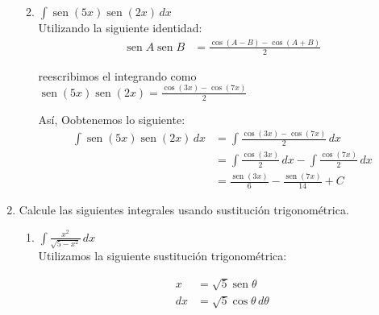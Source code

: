 \documentclass[a4paper,10pt]{article}
\newcommand{\dis}{\displaystyle}
\def\sin{\operatorname{sen}}
\begin{document}
\begin{enumerate}
\begin{enumerate}[label=\emph{\alph*)}]
\newpage
\item $\dis \int \sin(5x) \sin(2x)\, dx$\\

Utilizando la siguiente identidad:
\begin{align*}
 \dis \sin A \sin B  &=    \frac{\cos (A-B) - \cos (A+B)}{2}
\end{align*}

reescribimos el integrando como $\dis \sin(5x)\sin(2x) = \frac{\cos(3x)-\cos(7x)}{2}$

\dotfill [1 punto]

Así, Oobtenemos lo siguiente:
\begin{align*}
 \dis \int \sin(5x) \sin(2x)\, dx  &=    \dis \int \frac{\cos(3x)-\cos(7x)}{2} \, dx\\
 								   &=    \dis \int \frac{\cos (3x)}{2} \, dx - \int \frac{\cos (7x)}{2} \, dx\\
                                   &=    \dis \frac{\sin (3x)}{6} - \frac{\sin (7x)}{14} + C
\end{align*}
\dotfill [1 punto]




\end{enumerate}


\newpage
\item Calcule las siguientes integrales usando sustituci\'{o}n
trigonom\'{e}trica.
\begin{enumerate}[label=\emph{\alph*)}]
\item $\dis \int \frac{x^2}{\sqrt{5-x^2}}\, dx$\\

Utilizamos la siguiente sustitución trigonométrica:\\

\begin{minipage}{.3\textwidth}
\raggedright
\begin{align*}
x  &= \sqrt{5}\sin \theta      \\
dx &= \sqrt{5}\cos \theta  \, d\theta
\end{align*}
\end{minipage}%
\begin{minipage}{.3\textwidth}
\raggedleft
{}
\end{minipage}
\end{enumerate}
\end{enumerate}
\end{document}

